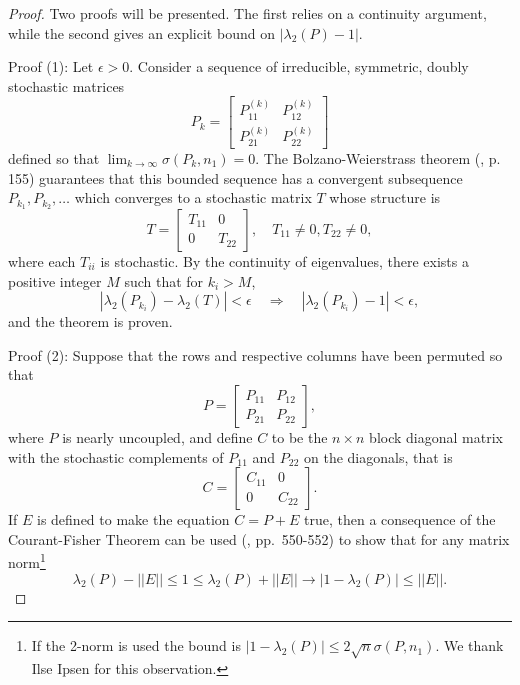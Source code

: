 \documentclass[final]{siamltex}
\begin{document}
\begin{proof}
Two proofs will be presented. The first relies on a continuity argument, while the second gives an explicit bound on $|\lambda_{2}(P)-1|$.

Proof (1): Let $\epsilon > 0$. Consider a sequence of irreducible, symmetric, doubly stochastic matrices 
\[
P_{k}= \left[
\begin{array}{cc}
 P_{11}^{(k)} & P_{12}^{(k)}     \\
 P_{21}^{(k)} & P_{22}^{(k)}  
\end{array}
\right]
\]
defined so that $\displaystyle \lim_{k \rightarrow \infty} \sigma(P_{k},n_{1}) = 0$. The Bolzano-Weierstrass theorem (\cite{bartle1964era}, p. 155) guarantees that this bounded sequence has a convergent subsequence $P_{k_{1}}, P_{k_{2}}, \dots$ which converges to a stochastic matrix $T$ whose structure is
\[
T=
\left[
\begin{array}{cc}
 T_{11} & 0     \\
 0 & T_{22}  
\end{array}
\right], \quad T_{11}\ne0, T_{22}\ne0, 
\]
where each $T_{ii}$ is stochastic. By the continuity of eigenvalues, there exists a positive integer $M$ such that for $k_{i} > M$,
\[
|\lambda_{2}(P_{k_{i}}) - \lambda_{2}(T)| < \epsilon \quad \Rightarrow \quad |\lambda_{2}(P_{k_{i}}) - 1| < \epsilon,
\]
and the theorem is proven.

Proof (2): Suppose that the rows and respective columns have been permuted so that 
\[
P= \left[
\begin{array}{cc}
 P_{11} & P_{12}     \\
 P_{21} & P_{22}  
\end{array}
\right],
\]
where $P$ is nearly uncoupled, and define $C$ to be the $n \times n$ block diagonal matrix with the stochastic complements of $P_{11}$ and $P_{22}$ on the diagonals, that is 
\[
C= \left[
\begin{array}{cc}
 C_{11} & 0     \\
 0 & C_{22}  
\end{array}
\right].
\]
If $E$ is defined to make the equation $C=P+E$ true, then a consequence of the Courant-Fisher Theorem can be used (\cite{meyer2000maa}, pp.~550-552) to show that for any matrix norm\footnote{If the 2-norm is used the bound is $|1-\lambda_{2}(P)| \le 2\sqrt{n}\sigma(P,n_{1})$. We thank Ilse Ipsen for this observation.}
\[
\lambda_{2}(P) - ||E|| \le 1 \le \lambda_{2}(P) + ||E|| \rightarrow  |1-\lambda_{2}(P)| \le  ||E||. 
\] 
\end{proof}
  
\end{document}
